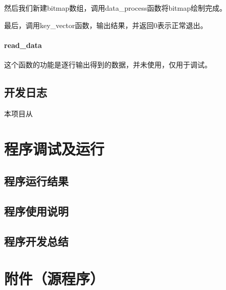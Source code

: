 \documentclass[a4paper]{ctexart}
\begin{document}
	然后我们新建bitmap数组，调用data\_process函数将bitmap绘制完成。

	最后，调用key\_vector函数，输出结果，并返回0表示正常退出。
	\paragraph{read\_data}
	这个函数的功能是逐行输出得到的数据，并未使用，仅用于调试。
	\subsection{开发日志}
	本项目从
	\section{程序调试及运行}
	\subsection{程序运行结果}
	\subsection{程序使用说明}
	\subsection{程序开发总结}
	\section{附件（源程序）}
\end{document}
